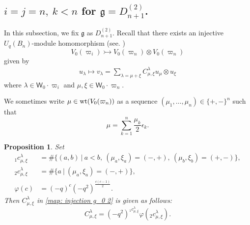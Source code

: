 \documentclass[11pt, leqno]{amsart}
\newtheorem{proposition}[theorem]{Proposition}
\theoremstyle{definition}
\numberwithin{equation}{section}
\begin{document}
\subsection{$i=j=n, \ k <n$ for ${\mathfrak g}=D^{(2)}_{n+1}$.} In this subsection, we fix ${\mathfrak g}$ as $D^{(2)}_{n+1}$.
Recall that there exists an injective $U_q(B_n)$-module homomorphism (see. \cite[Chapter 8]{HK02})
$$ V_0({\varpi}_{i}) \rightarrowtail V_0({\varpi}_{n}) \otimes V_0({\varpi}_{n})$$
given by
\begin{align} \label{map: injection g_0 2}
u_\lambda \longmapsto v_\lambda= \sum_{\lambda=\mu+\xi}
C_{\mu,\xi}^{\lambda} u_\mu \otimes u_\xi
\end{align}
where $\lambda \in \mathsf{W}_0\cdot{\varpi}_{i}$ and $\mu,\xi\in \mathsf{W}_0\cdot{\varpi}_{n}$.

We sometimes write $\mu \in {\rm wt}(V_0({\varpi}_{n})) $ as a sequence
$(\mu_1, \ldots, \mu_n) \in \{ +,- \}^{n}$ such that
$$\mu=\sum_{k=1}^{n} \dfrac{\mu_k}{2} \epsilon_k.$$

\begin{proposition} \label{prop: c spin}
Set
\begin{equation} \label{eq: coeff c 2}
\begin{aligned}
{}_1c_{\mu,\xi}^{\lambda} & = \# \{ (a,b) \ | \ a<b, \
(\mu_a,\xi_a)=(-,+), \ (\mu_b,\xi_b)=(+,-) \}, \\
{}_2c_{\mu,\xi}^{\lambda} & = \# \{ a \ | \ (\mu_a,\xi_a)=(-,+) \}, \\
\varphi(c) & = (-q)^{c} {(-q^2)}^{\frac{c(c-1)}{2}}.
\end{aligned}
\end{equation} Then $C_{\mu,\xi}^{\lambda}$ in \eqref{map: injection g_0 2} is given as follows:
$$C_{\mu,\xi}^{\lambda} ={(-q^2)}^{{}_1c_{\mu,\xi}^{\lambda}} \varphi({}_2c_{\mu,\xi}^{\lambda}).$$
\end{proposition}
\end{document}
